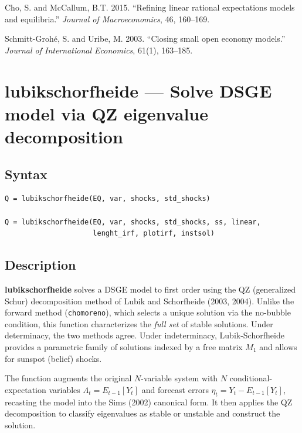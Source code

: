 \documentclass{article}
\begin{document}
\medskip
\noindent Cho, S. and McCallum, B.T. 2015. ``Refining linear rational expectations models and equilibria.'' \textit{Journal of Macroeconomics}, 46, 160--169.

\medskip
\noindent Schmitt-Groh\'e, S. and Uribe, M. 2003. ``Closing small open economy models.'' \textit{Journal of International Economics}, 61(1), 163--185.

\newpage
\section{lubikschorfheide --- Solve DSGE model via QZ eigenvalue decomposition}

\subsection{Syntax}

\begin{verbatim}
Q = lubikschorfheide(EQ, var, shocks, std_shocks)

Q = lubikschorfheide(EQ, var, shocks, std_shocks, ss, linear,
                     lenght_irf, plotirf, instsol)
\end{verbatim}

\subsection{Description}

\textbf{lubikschorfheide} solves a DSGE model to first order using the QZ (generalized Schur) decomposition method of Lubik and Schorfheide (2003, 2004). Unlike the forward method (\texttt{chomoreno}), which selects a unique solution via the no-bubble condition, this function characterizes the \textit{full set} of stable solutions. Under determinacy, the two methods agree. Under indeterminacy, Lubik-Schorfheide provides a parametric family of solutions indexed by a free matrix $M_1$ and allows for sunspot (belief) shocks.

The function augments the original $N$-variable system with $N$ conditional-expectation variables $\Lambda_t = E_{t-1}[Y_t]$ and forecast errors $\eta_t = Y_t - E_{t-1}[Y_t]$, recasting the model into the Sims (2002) canonical form. It then applies the QZ decomposition to classify eigenvalues as stable or unstable and construct the solution.
\end{document}
